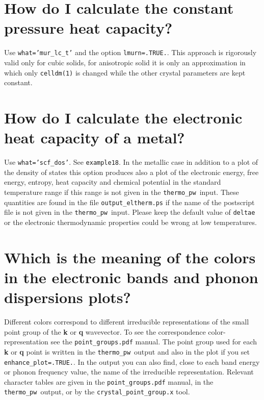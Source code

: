 \documentclass[12pt,a4paper]{article}
\def\thermo{\texttt{thermo\_pw}}
\begin{document}
\section{\color{coral} How do I calculate the constant pressure heat capacity?}
Use \texttt{what='mur\_lc\_t'} and the option \texttt{lmurn=.TRUE.}.
This approach is rigorously valid only for cubic solids, for anisotropic
solid it is only an approximation in which only \texttt{celldm(1)} is
changed while the other crystal parameters are kept constant.

\section{\color{coral} How do I calculate the electronic heat capacity
of a metal?}
Use \texttt{what='scf\_dos'}. See \texttt{example18}. In the metallic
case in addition to a plot of the density of states this option produces
also a plot of the electronic energy, free energy, entropy, heat capacity
and chemical potential in the standard temperature range if this range is
not given in the \thermo\ input. These quantities are found in the file
\texttt{output\_eltherm.ps} if the name of the postscript
file is not given in the \thermo\ input.
Please keep the default value of \texttt{deltae} or the electronic
thermodynamic properties could be wrong at low temperatures.

\section{\color{coral} Which is the meaning of the colors in
the electronic bands and phonon dispersions plots?}
Different colors correspond to different irreducible representations of 
the small point group of the {\bf k} or {\bf q} wavevector. To see the
correspondence color-representation see the \texttt{point\_groups.pdf} 
manual. The point group used for each {\bf k} or {\bf q} point is
written in the \thermo\ output and also in the plot if you set
\texttt{enhance\_plot=.TRUE.}. In the output you can also find,
close to each band energy or phonon frequency value, the name of the
irreducible representation. Relevant character tables are given in the
\texttt{point\_groups.pdf} manual, in the \thermo\ output, or by the
\texttt{crystal\_point\_group.x} tool.
\end{document}
